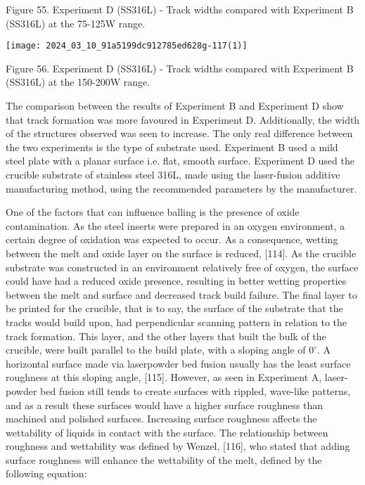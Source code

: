 \documentclass[10pt]{article}
\begin{document}
Figure 55. Experiment D (SS316L) - Track widths compared with Experiment B (SS316L) at the 75-125W range.

\begin{center}
\texttt{[image: 2024\_03\_10\_91a5199dc912785ed628g-117(1)]}
\end{center}

Figure 56. Experiment D (SS316L) - Track widths compared with Experiment B (SS316L) at the 150-200W range.

The comparison between the results of Experiment B and Experiment D show that track formation was more favoured in Experiment D. Additionally, the width of the structures observed was seen to increase. The only real difference between the two experiments is the type of substrate used. Experiment B used a mild steel plate with a planar surface i.e. flat, smooth surface. Experiment D used the crucible substrate of stainless steel 316L, made using the laser-fusion additive manufacturing method, using the recommended parameters by the manufacturer.

One of the factors that can influence balling is the presence of oxide contamination. As the steel inserts were prepared in an oxygen environment, a certain degree of oxidation was expected to occur. As a consequence, wetting between the melt and oxide layer on the surface is reduced, [114]. As the crucible substrate was constructed in an environment relatively free of oxygen, the surface could have had a reduced oxide presence, resulting in better wetting properties between the melt and surface and decreased track build failure. The final layer to be printed for the crucible, that is to say, the surface of the substrate that the tracks would build upon, had perpendicular scanning pattern in relation to the track formation. This layer, and the other layers that built the bulk of the crucible, were built parallel to the build plate, with a sloping angle of $0^{\circ}$. A horizontal surface made via laserpowder bed fusion usually has the least surface roughness at this sloping angle, [115]. However, as seen in Experiment A, laser-powder bed fusion still tends to create surfaces with rippled, wave-like patterns, and as a result these surfaces would have a higher surface roughness than machined and polished surfaces. Increasing surface roughness affects the wettability of liquids in contact with the surface. The relationship between roughness and wettability was defined by Wenzel, [116], who stated that adding surface roughness will enhance the wettability of the melt, defined by the following equation:
\end{document}
